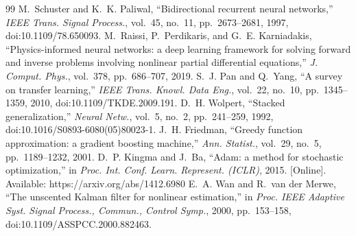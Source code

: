 \documentclass[journal]{IEEEtran}
\begin{document}
\begin{thebibliography}{99}
 M.~Schuster and K.~K. Paliwal, ``Bidirectional recurrent neural networks,'' \emph{IEEE Trans. Signal Process.}, vol.~45, no.~11, pp.~2673--2681, 1997, doi:10.1109/78.650093.
 M.~Raissi, P.~Perdikaris, and G.~E. Karniadakis, ``Physics-informed neural networks: a deep learning framework for solving forward and inverse problems involving nonlinear partial differential equations,'' \emph{J. Comput. Phys.}, vol.~378, pp.~686--707, 2019.
 S.~J. Pan and Q.~Yang, ``A survey on transfer learning,'' \emph{IEEE Trans. Knowl. Data Eng.}, vol.~22, no.~10, pp.~1345--1359, 2010, doi:10.1109/TKDE.2009.191.
 D.~H. Wolpert, ``Stacked generalization,'' \emph{Neural Netw.}, vol.~5, no.~2, pp.~241--259, 1992, doi:10.1016/S0893-6080(05)80023-1.
 J.~H. Friedman, ``Greedy function approximation: a gradient boosting machine,'' \emph{Ann. Statist.}, vol.~29, no.~5, pp.~1189--1232, 2001.
 D.~P. Kingma and J.~Ba, ``Adam: a method for stochastic optimization,'' in \emph{Proc. Int. Conf. Learn. Represent. (ICLR)}, 2015. [Online]. Available: https://arxiv.org/abs/1412.6980
 E.~A. Wan and R.~van der Merwe, ``The unscented {Kalman} filter for nonlinear estimation,'' in \emph{Proc. IEEE Adaptive Syst. Signal Process., Commun., Control Symp.}, 2000, pp.~153--158, doi:10.1109/ASSPCC.2000.882463.
\end{thebibliography}
\end{document}
